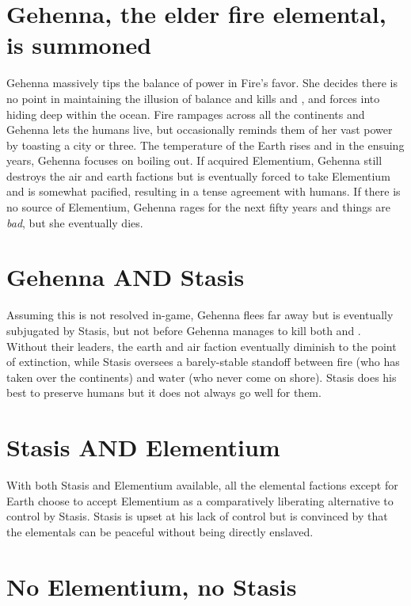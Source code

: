 \documentclass[green]{elementals}
\begin{document}
\section{Gehenna, the elder fire elemental, is summoned}

Gehenna massively tips the balance of power in Fire's favor. She decides there is no point in maintaining the illusion of balance and kills \cKing{} and \cEarthKing{}, and forces \cWaterQueen{} into hiding deep within the ocean. Fire rampages across all the continents and Gehenna lets the humans live, but occasionally reminds them of her vast power by toasting a city or three. The temperature of the Earth rises and in the ensuing years, Gehenna focuses on boiling \cWaterQueen{} out. If \cScientist{} acquired Elementium, Gehenna still destroys the air and earth factions but is eventually forced to take Elementium and is somewhat pacified, resulting in a tense agreement with humans. If there is no source of Elementium, Gehenna rages for the next fifty years and things are \emph{bad}, but she eventually dies.

\section{Gehenna AND Stasis}

Assuming this is not resolved in-game, Gehenna flees far away but is eventually subjugated by Stasis, but not before Gehenna manages to kill both \cKing{} and \cEarthKing{}. Without their leaders, the earth and air faction eventually diminish to the point of extinction, while Stasis oversees a barely-stable standoff between fire (who has taken over the continents) and water (who never come on shore). Stasis does his best to preserve humans but it does not always go well for them.

\section{Stasis AND Elementium}

With both Stasis and Elementium available, all the elemental factions except for Earth choose to accept Elementium as a comparatively liberating alternative to control by Stasis. Stasis is upset at his lack of control but is convinced by \cAvatar{\intro} that the elementals can be peaceful without being directly enslaved.

\section{No Elementium, no Stasis}
\end{document}
